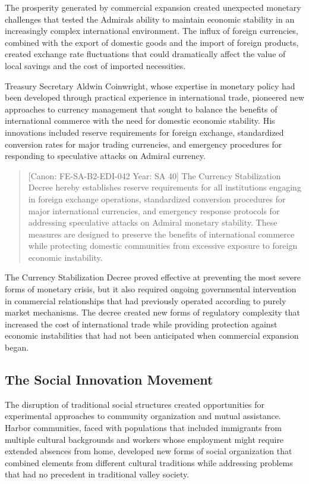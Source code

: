 The prosperity generated by commercial expansion created unexpected
monetary challenges that tested the Admiral\textquotesingle s ability to
maintain economic stability in an increasingly complex international
environment. The influx of foreign currencies, combined with the export
of domestic goods and the import of foreign products, created exchange
rate fluctuations that could dramatically affect the value of local
savings and the cost of imported necessities.

Treasury Secretary Aldwin Coinwright, whose expertise in monetary policy
had been developed through practical experience in international trade,
pioneered new approaches to currency management that sought to balance
the benefits of international commerce with the need for domestic
economic stability. His innovations included reserve requirements for
foreign exchange, standardized conversion rates for major trading
currencies, and emergency procedures for responding to speculative
attacks on Admiral currency.

\begin{quote}
{[}Canon: FE-SA-B2-EDI-042 \textbar{} Year: SA 40{]} The Currency
Stabilization Decree hereby establishes reserve requirements for all
institutions engaging in foreign exchange operations, standardized
conversion procedures for major international currencies, and emergency
response protocols for addressing speculative attacks on Admiral
monetary stability. These measures are designed to preserve the benefits
of international commerce while protecting domestic communities from
excessive exposure to foreign economic instability.
\end{quote}

The Currency Stabilization Decree proved effective at preventing the
most severe forms of monetary crisis, but it also required ongoing
governmental intervention in commercial relationships that had
previously operated according to purely market mechanisms. The decree
created new forms of regulatory complexity that increased the cost of
international trade while providing protection against economic
instabilities that had not been anticipated when commercial expansion
began.

\subsection{The Social Innovation
Movement}\label{the-social-innovation-movement}

The disruption of traditional social structures created opportunities
for experimental approaches to community organization and mutual
assistance. Harbor communities, faced with populations that included
immigrants from multiple cultural backgrounds and workers whose
employment might require extended absences from home, developed new
forms of social organization that combined elements from different
cultural traditions while addressing problems that had no precedent in
traditional valley society.

